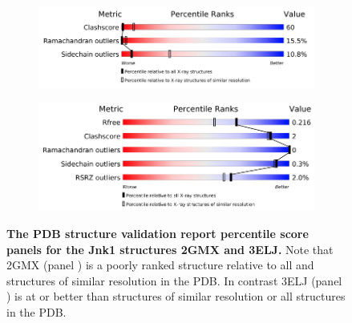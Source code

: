 \documentclass[9pt,bestpractices]{livecoms}
\begin{document}
\begin{figure}
    \centering
    \begin{subfigure}[b]{0.48\textwidth}
        \includegraphics[width=\textwidth]{crystal/Jnk1_2gmx_pdb_report.png}
        \caption{}
        \label{fig:jnk1_pdb_report_2gmx}
    \end{subfigure}
    
    \begin{subfigure}[b]{0.48\textwidth}
        \includegraphics[width=\textwidth]{crystal/Jnk1_3elj_pdb_report.png}
        \caption{}
        \label{fig:jnk1_pdb_report_3elj}
    \end{subfigure}
    \caption{\textbf{The PDB structure validation report percentile score panels for the Jnk1 structures 2GMX and 3ELJ.} Note that 2GMX (panel ) is a poorly ranked structure relative to all and structures of similar resolution in the PDB.  In contrast 3ELJ (panel ) is at or better than structures of similar resolution or all structures in the PDB.}
    \label{fig:jnk1_pdb_report}
\end{figure}
\end{document}
